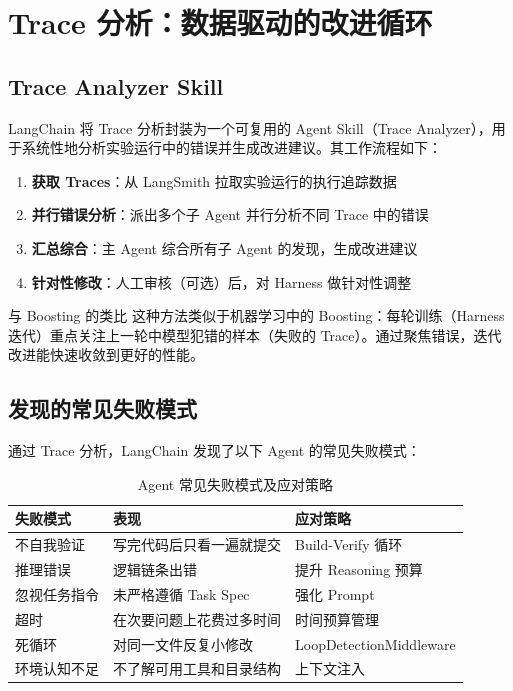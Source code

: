 \section{Trace 分析：数据驱动的改进循环}

\subsection{Trace Analyzer Skill}

LangChain 将 Trace 分析封装为一个可复用的 Agent Skill（Trace Analyzer），用于系统性地分析实验运行中的错误并生成改进建议。其工作流程如下：

\begin{enumerate}[leftmargin=2em]
    \item \textbf{获取 Traces}：从 LangSmith 拉取实验运行的执行追踪数据
    \item \textbf{并行错误分析}：派出多个子 Agent 并行分析不同 Trace 中的错误
    \item \textbf{汇总综合}：主 Agent 综合所有子 Agent 的发现，生成改进建议
    \item \textbf{针对性修改}：人工审核（可选）后，对 Harness 做针对性调整
\end{enumerate}

\begin{knowledgebox}{与 Boosting 的类比}
这种方法类似于机器学习中的 Boosting：每轮训练（Harness 迭代）重点关注上一轮中模型犯错的样本（失败的 Trace）。通过聚焦错误，迭代改进能快速收敛到更好的性能。
\end{knowledgebox}

\subsection{发现的常见失败模式}

通过 Trace 分析，LangChain 发现了以下 Agent 的常见失败模式：

\begin{table}[H]
\centering
\caption{Agent 常见失败模式及应对策略}
\begin{tabular}{p{4cm}p{4cm}p{4.5cm}}
\toprule
\textbf{失败模式} & \textbf{表现} & \textbf{应对策略} \\
\midrule
不自我验证 & 写完代码后只看一遍就提交 & Build-Verify 循环 \\
推理错误 & 逻辑链条出错 & 提升 Reasoning 预算 \\
忽视任务指令 & 未严格遵循 Task Spec & 强化 Prompt \\
超时 & 在次要问题上花费过多时间 & 时间预算管理 \\
死循环 & 对同一文件反复小修改 & LoopDetectionMiddleware \\
环境认知不足 & 不了解可用工具和目录结构 & 上下文注入 \\
\bottomrule
\end{tabular}
\end{table}


